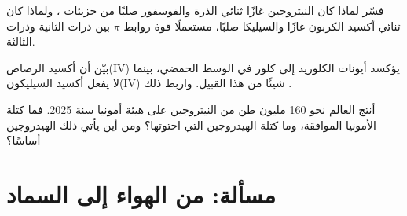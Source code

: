 \begin{exercise}[$\star\star\star$]\label{exo:b1:p-block-13-15:10}
فسّر لماذا كان النيتروجين غازًا ثنائي الذرة والفوسفور صلبًا من جزيئات ،
ولماذا كان ثنائي أكسيد الكربون غازًا والسيليكا صلبًا، مستعملًا
قوة روابط $\pi$ بين ذرات  الثانية وذرات  الثالثة.
\end{exercise}

\begin{exercise}[$\star\star\star$]\label{exo:b1:p-block-13-15:11}
بيّن  أن أكسيد الرصاص(IV) يؤكسد أيونات الكلوريد
إلى كلور في الوسط الحمضي، بينما لا يفعل أكسيد السيليكون(IV) شيئًا من هذا
القبيل. واربط ذلك .
\end{exercise}

\begin{exercise}[$\star\star\star$]\label{exo:b1:p-block-13-15:12}
أنتج العالم نحو 160 مليون طن من النيتروجين على هيئة أمونيا سنة 2025.
فما كتلة الأمونيا الموافقة، وما كتلة الهيدروجين التي احتوتها؟
ومن أين يأتي ذلك الهيدروجين أساسًا؟
\end{exercise}

\section{مسألة: من الهواء إلى السماد}


